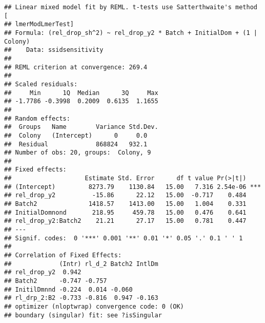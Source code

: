 \documentclass[]{article}
\begin{document}
\begin{verbatim}
## Linear mixed model fit by REML. t-tests use Satterthwaite's method [
## lmerModLmerTest]
## Formula: (rel_drop_sh^2) ~ rel_drop_y2 * Batch + InitialDom + (1 | Colony)
##    Data: ssidsensitivity
## 
## REML criterion at convergence: 269.4
## 
## Scaled residuals: 
##     Min      1Q  Median      3Q     Max 
## -1.7786 -0.3998  0.2009  0.6135  1.1655 
## 
## Random effects:
##  Groups   Name        Variance Std.Dev.
##  Colony   (Intercept)      0     0.0   
##  Residual             868824   932.1   
## Number of obs: 20, groups:  Colony, 9
## 
## Fixed effects:
##                    Estimate Std. Error      df t value Pr(>|t|)    
## (Intercept)         8273.79    1130.84   15.00   7.316 2.54e-06 ***
## rel_drop_y2          -15.86      22.12   15.00  -0.717    0.484    
## Batch2              1418.57    1413.00   15.00   1.004    0.331    
## InitialDomnond       218.95     459.78   15.00   0.476    0.641    
## rel_drop_y2:Batch2    21.21      27.17   15.00   0.781    0.447    
## ---
## Signif. codes:  0 '***' 0.001 '**' 0.01 '*' 0.05 '.' 0.1 ' ' 1
## 
## Correlation of Fixed Effects:
##             (Intr) rl_d_2 Batch2 IntlDm
## rel_drop_y2  0.942                     
## Batch2      -0.747 -0.757              
## InitilDmnnd -0.224  0.014 -0.060       
## rl_drp_2:B2 -0.733 -0.816  0.947 -0.163
## optimizer (nloptwrap) convergence code: 0 (OK)
## boundary (singular) fit: see ?isSingular
\end{verbatim}
\end{document}
